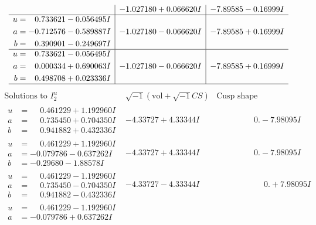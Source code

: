 \documentclass[1p]{elsarticle_modified}
\theoremstyle{definition}
\newcommand{\I}{\sqrt{-1}}
\begin{document}
$$\begin{array}{c|c|c}
 & -1.027180 + 0.066620 I & -7.89585 - 0.16999 I \\ \hline\begin{aligned}
u &= \phantom{-}0.733621 - 0.056495 I \\
a &= -0.712576 - 0.589887 I \\
b &= \phantom{-}0.390901 - 0.249697 I\end{aligned}
 & -1.027180 - 0.066620 I & -7.89585 + 0.16999 I \\ \hline\begin{aligned}
u &= \phantom{-}0.733621 - 0.056495 I \\
a &= \phantom{-}0.000334 + 0.690063 I \\
b &= \phantom{-}0.498708 + 0.023336 I\end{aligned}
 & -1.027180 - 0.066620 I & -7.89585 + 0.16999 I\\
 \hline 
 \end{array}$$\newpage$$\begin{array}{c|c|c}  
\text{Solutions to }I^u_{2}& \I (\text{vol} + \sqrt{-1}CS) & \text{Cusp shape}\\
 \hline 
\begin{aligned}
u &= \phantom{-}0.461229 + 1.192960 I \\
a &= \phantom{-}0.735450 + 0.704350 I \\
b &= \phantom{-}0.941882 + 0.432336 I\end{aligned}
 & -4.33727 + 4.33344 I & \phantom{-0.000000 } 0. - 7.98095 I \\ \hline\begin{aligned}
u &= \phantom{-}0.461229 + 1.192960 I \\
a &= -0.079786 - 0.637262 I \\
b &= -0.29680 - 1.88578 I\end{aligned}
 & -4.33727 + 4.33344 I & \phantom{-0.000000 } 0. - 7.98095 I \\ \hline\begin{aligned}
u &= \phantom{-}0.461229 - 1.192960 I \\
a &= \phantom{-}0.735450 - 0.704350 I \\
b &= \phantom{-}0.941882 - 0.432336 I\end{aligned}
 & -4.33727 - 4.33344 I & \phantom{-0.000000 -}0. + 7.98095 I \\ \hline\begin{aligned}
u &= \phantom{-}0.461229 - 1.192960 I \\
a &= -0.079786 + 0.637262 I \\

\end{aligned}
\end{array}$$
\end{document}
